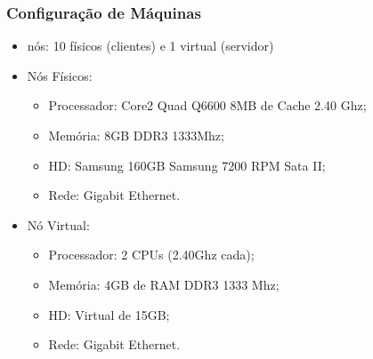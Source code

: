 \documentclass{beamer}
\begin{document}
\begin{frame} \frametitle{Configuração de Máquinas}
\begin{itemize}
  \item {} nós: 10 físicos (clientes) e 1 virtual (servidor)
	\item Nós Físicos:
	\begin{itemize}
  		\item Processador: Core2 Quad Q6600 8MB de Cache 2.40 Ghz;
  		\item Memória: 8GB DDR3 1333Mhz;
  		\item HD: Samsung 160GB Samsung 7200 RPM Sata II;
  		\item Rede: Gigabit Ethernet.
	\end{itemize}

	\item Nó Virtual:
	\begin{itemize}
  		\item Processador: 2 CPUs (2.40Ghz cada);
 		\item Memória: 4GB de RAM DDR3 1333 Mhz;
  		\item HD: Virtual de 15GB;
  		\item Rede: Gigabit Ethernet.
	\end{itemize}
\end{itemize}
\end{frame}
\end{document}
